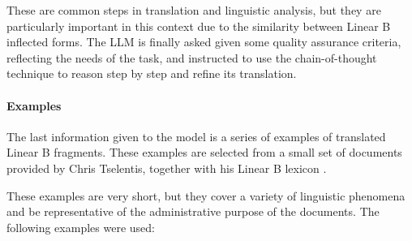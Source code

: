 These are common steps in translation and linguistic analysis, but they are particularly important in this context due to the similarity between Linear B inflected forms.
The LLM is finally asked given some quality assurance criteria, reflecting the needs of the task, and instructed to use the chain-of-thought technique to reason step by step and refine its translation.

\paragraph{Examples}
The last information given to the model is a series of examples of translated Linear B fragments.
These examples are selected from a small set of documents provided by Chris Tselentis, together with his Linear B lexicon \cite{tselentis}.

These examples are very short, but they cover a variety of linguistic phenomena and be representative of the administrative purpose of the documents.
The following examples were used:

